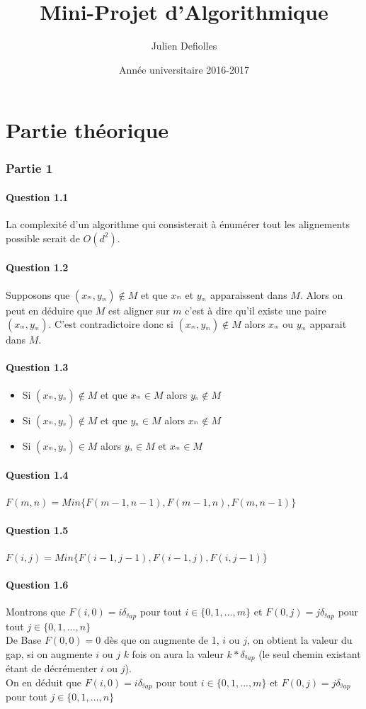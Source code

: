 \documentclass[5pt,a4paper]{report}
\title{Mini-Projet d’Algorithmique}
\author{Julien Defiolles}
\date{Année universitaire 2016-2017}
\begin{document}
	\maketitle
	\part{Partie théorique}
	\section*{Partie 1}
	\subsection*{Question 1.1}
	La complexité d'un algorithme  qui consisterait à énumérer tout les alignements possible serait de $O(d^2)$.
	\subsection*{Question 1.2}
	Supposons que $(x_{^m},y_{^m})\notin M$ et que $x_{^m}$ et $ y_{^m}$ apparaissent dans $M$.
	Alors on peut en déduire que $M$ est aligner sur $m$ c'est à dire qu'il existe une paire $(x_{^m},y_{^m})$. C'est contradictoire donc si $(x_{^m},y_{^m})\notin M$ alors $x_{^m}$ ou $ y_{^m}$ apparait dans $M$.
	\subsection*{Question 1.3}
	\begin{itemize}
		\item Si $(x_{^m},y_{^n})\notin M$ et que $x_{^m}\in M$ alors $ y_{^n}\notin M$
		\item Si $(x_{^m},y_{^n})\notin M$ et que $y_{^n}\in M$ alors $ x_{^m}\notin M$
		\item Si $(x_{^m},y_{^n})\in M$ alors $ y_{^n}\in M$ et $x_{^m}\in M$
	\end{itemize}
	\subsection*{Question 1.4}
	$F(m,n) = Min\{F(m-1,n-1),F(m-1,n),F(m,n-1)\}$
	
	\subsection*{Question 1.5}
	$F(i,j) = Min\{F(i-1,j-1),F(i-1,j),F(i,j-1)\}$
	
	\subsection*{Question 1.6}
	Montrons que $F(i,0) = i\delta_{^gap}$ pour tout $i\in \{0,1,...,m\}$ et $F(0,j) = j\delta_{^gap}$ pour tout $j\in \{0,1,...,n\}$\\
	De Base $F(0,0) = 0$ dès que on augmente de 1, $i$ ou $j$, on obtient la valeur du gap, si on augmente $i$ ou $j$ $k$ fois on aura la valeur $k*\delta_{^gap}$ (le seul chemin existant étant de décrémenter $i$ ou $j$).\\ On en déduit que $F(i,0) = i\delta_{^gap}$ pour tout $i\in \{0,1,...,m\}$ et $F(0,j) = j\delta_{^gap}$ pour tout $j\in \{0,1,...,n\}$
	
\end{document}
